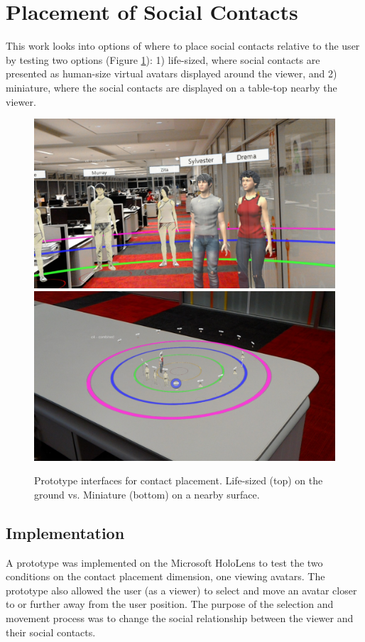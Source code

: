 \section{Placement of Social Contacts}
\label{sec:contacts:placing}

This work looks into options of where to place social contacts relative to the user \cite{Nassani2017a} by testing two options (Figure \ref{fig:continuum:conditions}): 1) life-sized, where social contacts are presented as human-size virtual avatars displayed around the viewer, and 2) miniature, where the social contacts are displayed on a table-top nearby the viewer. 

\begin{figure}[h]
    \centering
    \includegraphics[width=0.6\linewidth]{images/ismar17/20170625_205203_HoloLens.jpg}    \includegraphics[width=0.6\linewidth]{images/ismar17/20170625_205112_HoloLens.jpg}
    \caption{Prototype interfaces for contact placement. Life-sized (top) on the ground vs. Miniature (bottom) on a nearby surface.} 
    \label{fig:continuum:conditions}
\end{figure}

\subsection{Implementation}

A prototype was implemented on the Microsoft HoloLens to test the two conditions on the contact placement dimension, one viewing avatars. The prototype also allowed the user (as a viewer) to select and move an avatar closer to or further away from the user position. The purpose of the selection and movement process was to change the social relationship between the viewer and their social contacts. 

